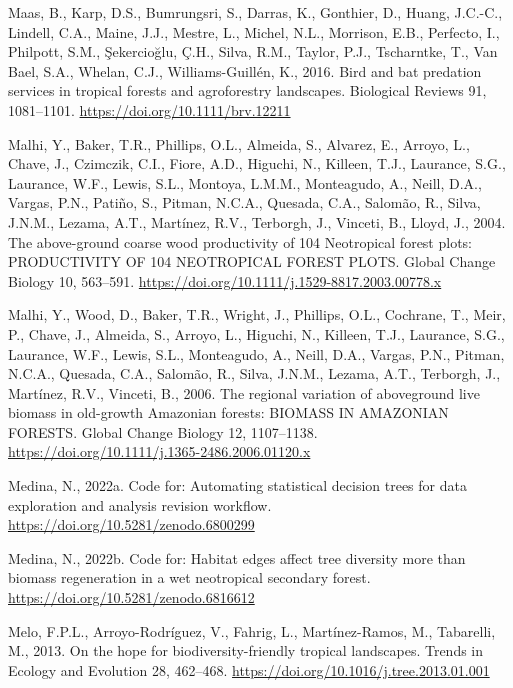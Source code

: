 \documentclass[
  12pt,
]{article}
\newlength{\cslhangindent}
\newlength{\cslentryspacingunit} %
\newenvironment{CSLReferences}[2] %
 {%
  \setlength{\parindent}{0pt}
  \ifodd #1
  \let\oldpar\par
  \def\par{\hangindent=\cslhangindent\oldpar}
  \fi
  \setlength{\parskip}{#2\cslentryspacingunit}
 }%
 {}
\begin{document}
\begin{CSLReferences}{1}{0}
\leavevmode{}%
Maas, B., Karp, D.S., Bumrungsri, S., Darras, K., Gonthier, D., Huang, J.C.-C., Lindell, C.A., Maine, J.J., Mestre, L., Michel, N.L., Morrison, E.B., Perfecto, I., Philpott, S.M., Şekercioğlu, Ç.H., Silva, R.M., Taylor, P.J., Tscharntke, T., Van Bael, S.A., Whelan, C.J., Williams-Guillén, K., 2016. Bird and bat predation services in tropical forests and agroforestry landscapes. Biological Reviews 91, 1081--1101. \url{https://doi.org/10.1111/brv.12211}

\leavevmode{}%
Malhi, Y., Baker, T.R., Phillips, O.L., Almeida, S., Alvarez, E., Arroyo, L., Chave, J., Czimczik, C.I., Fiore, A.D., Higuchi, N., Killeen, T.J., Laurance, S.G., Laurance, W.F., Lewis, S.L., Montoya, L.M.M., Monteagudo, A., Neill, D.A., Vargas, P.N., Patiño, S., Pitman, N.C.A., Quesada, C.A., Salomão, R., Silva, J.N.M., Lezama, A.T., Martínez, R.V., Terborgh, J., Vinceti, B., Lloyd, J., 2004. The above-ground coarse wood productivity of 104 {Neotropical} forest plots: {PRODUCTIVITY OF} 104 {NEOTROPICAL FOREST PLOTS}. Global Change Biology 10, 563--591. \url{https://doi.org/10.1111/j.1529-8817.2003.00778.x}

\leavevmode{}%
Malhi, Y., Wood, D., Baker, T.R., Wright, J., Phillips, O.L., Cochrane, T., Meir, P., Chave, J., Almeida, S., Arroyo, L., Higuchi, N., Killeen, T.J., Laurance, S.G., Laurance, W.F., Lewis, S.L., Monteagudo, A., Neill, D.A., Vargas, P.N., Pitman, N.C.A., Quesada, C.A., Salomão, R., Silva, J.N.M., Lezama, A.T., Terborgh, J., Martínez, R.V., Vinceti, B., 2006. The regional variation of aboveground live biomass in old-growth {Amazonian} forests: {BIOMASS IN AMAZONIAN FORESTS}. Global Change Biology 12, 1107--1138. \url{https://doi.org/10.1111/j.1365-2486.2006.01120.x}

\leavevmode{}%
Medina, N., 2022a. {Code for: Automating statistical decision trees for data exploration and analysis revision workflow}. \url{https://doi.org/10.5281/zenodo.6800299}

\leavevmode{}%
Medina, N., 2022b. {Code for: Habitat edges affect tree diversity more than biomass regeneration in a wet neotropical secondary forest}. \url{https://doi.org/10.5281/zenodo.6816612}

\leavevmode{}%
Melo, F.P.L., Arroyo-Rodríguez, V., Fahrig, L., Martínez-Ramos, M., Tabarelli, M., 2013. On the hope for biodiversity-friendly tropical landscapes. Trends in Ecology and Evolution 28, 462--468. \url{https://doi.org/10.1016/j.tree.2013.01.001}


\end{CSLReferences}
\end{document}
